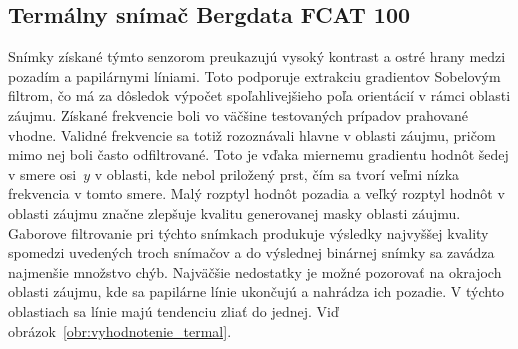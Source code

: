   \subsection{Termálny snímač Bergdata FCAT 100}
  Snímky získané týmto senzorom preukazujú vysoký kontrast a ostré hrany medzi pozadím a papilárnymi líniami. Toto podporuje extrakciu gradientov Sobelovým
  filtrom, čo má za dôsledok výpočet spoľahlivejšieho poľa orientácií v rámci oblasti záujmu. Získané frekvencie boli vo väčšine testovaných prípadov
  prahované vhodne. Validné frekvencie sa totiž rozoznávali hlavne v oblasti záujmu, pričom mimo nej boli často odfiltrované. Toto je vďaka miernemu gradientu
  hodnôt šedej v smere osi~{$y$} v oblasti, kde nebol priložený prst, čím sa tvorí veľmi nízka frekvencia v tomto smere.
  Malý rozptyl hodnôt pozadia a veľký rozptyl hodnôt v oblasti záujmu značne zlepšuje kvalitu generovanej masky oblasti záujmu.
  Gaborove filtrovanie pri týchto snímkach produkuje výsledky najvyššej kvality spomedzi uvedených troch snímačov a do výslednej binárnej snímky sa zavádza
  najmenšie množstvo chýb. Najväčšie nedostatky je možné pozorovať na okrajoch
  oblasti záujmu, kde sa papilárne línie ukončujú a nahrádza ich pozadie. V týchto oblastiach sa línie majú tendenciu zliať do jednej.
  Viď obrázok~{\ref{obr:vyhodnotenie_termal}}.
